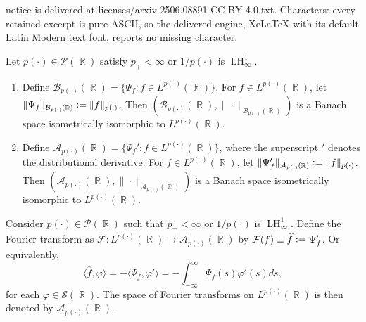 \documentclass[10pt,a4paper]{amsart}
\DeclareMathOperator{\R}{\mathbb{R}}
\newcommand{\LH}{\operatorname{LH}_\infty^1}
\newcommand{\Lp}{L^{\p}(\R)}
\newcommand{\defeq}{\vcentcolon=}
\newcommand{\p}{p(\cdot)}
\begin{document}
notice is delivered at licenses/arxiv-2506.08891-CC-BY-4.0.txt. Characters: every retained excerpt is pure ASCII, so the delivered engine, XeLaTeX with its default Latin Modern text font, reports no missing character.
\begin{theorem}\label{theo_1}
     Let $\p\in \mathcal{P}(\R)$ satisfy $p_{+}<\infty$ or $1/\p$ is $\LH$.
     \begin{enumerate}
         \item Define $\mathcal{B}_{p(\cdot)}(\R) = \{\Psi_f : f\in L^{p(\cdot)}(\R)\}$. For $f\in L^{\p}(\R)$, let $\|\Psi_f\|_{\mathcal{B}_{\p}(\R)}\defeq\|f\|_{\p}$. Then  $\left(\mathcal{B}_{p(\cdot)}(\R),\|\cdot\|_{\mathcal{B}_{\p}(\R)}\right)$ is a Banach space isometrically isomorphic to $L^{\p}(\R)$.
         \item Define $\mathcal{A}_{\p}(\R) = \{\Psi_f': f\in L^{\p}(\R)\}$, where the superscript $'$ denotes the distributional derivative. For $f\in L^{\p}(\R)$, let $\|\Psi_f'\|_{\mathcal{A}_{\p}(\R)}\defeq\|f\|_{\p}$. Then 
         \noindent $\left(\mathcal{A}_{\p}(\R),\|\cdot\|_{\mathcal{A}_{\p}(\R)}\right)$ is a Banach space isometrically isomorphic to $\Lp$.
     \end{enumerate}
\end{theorem}

\begin{definition}\label{definition_Fourier}
    Consider $\p\in\mathcal{P}(\R)$ such that $p_{+}<\infty$ or $1/\p$ is $\LH$. Define the Fourier transform as $\mathcal{F}:\Lp\to \mathcal{A}_{\p}(\R)$ by $\mathcal{F}(f)\equiv\widehat{f}\defeq\Psi_f'$.
    Or equivalently,
    $$\langle \widehat{f},\varphi\rangle=-\langle \Psi_f,\varphi'\rangle=-\int_{-\infty}^{\infty}\Psi_f(s)\varphi'(s)ds,$$ for each $\varphi\in\mathcal{S}(\R)$. The space of Fourier transforms on $L^{\p}(\R)$ is then denoted by $\mathcal{A}_{\p}(\R)$. 
\end{definition}
\end{document}
